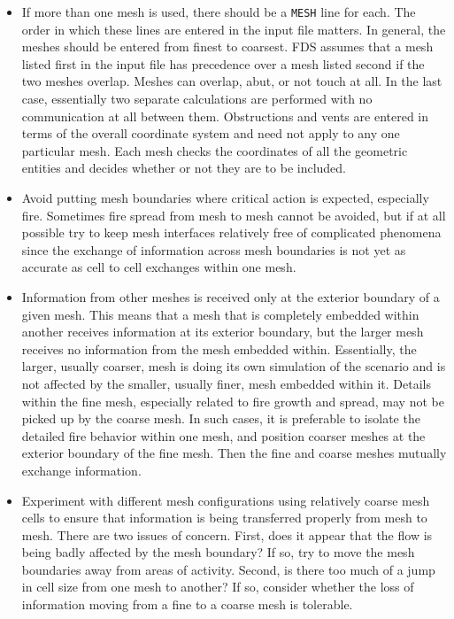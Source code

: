 \documentclass[11pt]{book}
\newcommand{\ct}{\tt\small}
\begin{document}
\begin{itemize}
\item If more than one mesh is used, there should be a
{\ct MESH} line for each. The order in which these
lines are entered in the input file matters. In general, the meshes should be entered
from finest to coarsest. FDS assumes that a mesh listed first in the input file has
precedence over a mesh listed second if the two meshes overlap.
Meshes can overlap, abut, or not touch at all. In the last case, essentially two separate
calculations are performed with no communication at all between them. Obstructions and vents are entered
in terms of the overall coordinate system and need not apply to any one particular mesh.
Each mesh checks the coordinates of all the geometric
entities and decides whether or not they are to be included.
\item Avoid putting mesh boundaries where critical action is expected,
especially fire. Sometimes fire spread from mesh to mesh cannot be
avoided, but if at all possible try to keep mesh interfaces relatively
free of complicated phenomena since the exchange of information across
mesh boundaries is not yet as accurate as cell to cell exchanges within one
mesh.
\item Information from other meshes is received only at the exterior boundary
of a given mesh. This means that a mesh that is completely embedded within
another receives information at its exterior boundary, but the larger
mesh receives no information from the mesh embedded within. Essentially,
the larger, usually coarser, mesh is doing its own simulation of the scenario
and is not affected by the smaller, usually finer, mesh embedded within it.
Details within the fine mesh, especially related to fire growth and spread,
may not be picked up by the coarse mesh. In such cases, it is preferable to
isolate the detailed fire behavior within one mesh, and position coarser
meshes at the exterior boundary of the fine mesh. Then the fine and coarse
meshes mutually exchange information.
\item Experiment with different mesh configurations using relatively
coarse mesh cells to ensure that information is being transferred
properly from mesh to mesh. There are two issues of concern. First,
does it appear that the flow is being badly affected by the mesh boundary? If so,
try to move the mesh boundaries away from areas of activity. Second,
is there too much of a jump in cell size from one mesh to another? If so, consider
whether the loss of information moving from a fine to a coarse mesh is tolerable.

\end{itemize}
\end{document}
